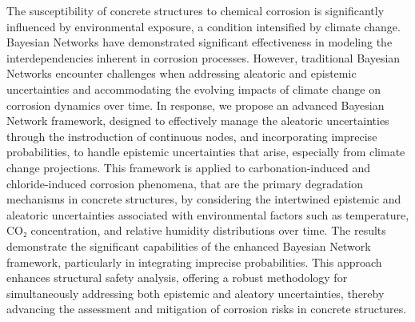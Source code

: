 The susceptibility of concrete structures to chemical corrosion is significantly influenced by environmental exposure, a condition intensified by climate change. 
Bayesian Networks have demonstrated significant effectiveness in modeling the interdependencies inherent in corrosion processes. However, traditional Bayesian Networks encounter challenges when addressing aleatoric and epistemic uncertainties and accommodating the evolving impacts of climate change on corrosion dynamics over time. In response, we propose an advanced Bayesian Network framework, designed to effectively manage the aleatoric uncertainties through the instroduction of continuous nodes, and incorporating imprecise probabilities, to handle epistemic uncertainties that arise, especially from climate change projections. This framework is applied to carbonation-induced and chloride-induced corrosion phenomena, that are the primary degradation mechanisms in concrete structures, by considering the intertwined epistemic and aleatoric uncertainties associated with environmental factors such as temperature, CO₂ concentration, and relative humidity distributions over time. The results demonstrate the significant capabilities of the enhanced Bayesian Network framework, particularly in integrating imprecise probabilities. This approach enhances structural safety analysis, offering a robust methodology for simultaneously addressing both epistemic and aleatory uncertainties, thereby advancing the assessment and mitigation of corrosion risks in concrete structures.


